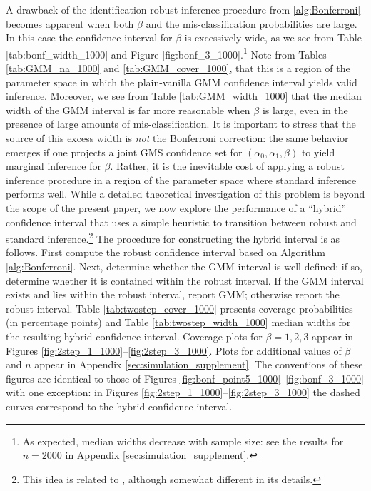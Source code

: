 A drawback of the identification-robust inference procedure from \ref{alg:Bonferroni} becomes apparent when both $\beta$ and the mis-classification probabilities are large.
In this case the confidence interval for $\beta$ is excessively wide, as we see from Table \ref{tab:bonf_width_1000} and Figure \ref{fig:bonf_3_1000}.\footnote{As expected, median widths decrease with sample size: see the results for $n = 2000$ in Appendix \ref{sec:simulation_supplement}.}
Note from Tables \ref{tab:GMM_na_1000} and \ref{tab:GMM_cover_1000}, that this is a region of the parameter space in which the plain-vanilla GMM confidence interval yields valid inference.
Moreover, we see from Table \ref{tab:GMM_width_1000} that the median width of the GMM interval is far more reasonable when $\beta$ is large, even in the presence of large amounts of mis-classification.
It is important to stress that the source of this excess width is \emph{not} the Bonferroni correction: the same behavior emerges if one projects a joint GMS confidence set for $(\alpha_0, \alpha_1, \beta)$ to yield marginal inference for $\beta$.
Rather, it is the inevitable cost of applying a robust inference procedure in a region of the parameter space where standard inference performs well.
While a detailed theoretical investigation of this problem is beyond the scope of the present paper, we now explore the performance of a ``hybrid'' confidence interval that uses a simple heuristic to transition between robust and standard inference.\footnote{This idea is related to \cite{andrews2016valid}, although somewhat different in its details.}
The procedure for constructing the hybrid interval is as follows.
First compute the robust confidence interval based on Algorithm \ref{alg:Bonferroni}.
Next, determine whether the GMM interval is well-defined: if so, determine whether it is contained within the robust interval.
If the GMM interval exists and lies within the robust interval, report GMM; otherwise report the robust interval.
Table \ref{tab:twostep_cover_1000} presents coverage probabilities (in percentage points) and Table \ref{tab:twostep_width_1000} median widths for the resulting hybrid confidence interval.
Coverage plots for $\beta = 1, 2, 3$ appear in Figures \ref{fig:2step_1_1000}--\ref{fig:2step_3_1000}.
Plots for additional values of $\beta$ and $n$ appear in Appendix \ref{sec:simulation_supplement}.
The conventions of these figures are identical to those of Figures \ref{fig:bonf_point5_1000}--\ref{fig:bonf_3_1000} with one exception: in Figures \ref{fig:2step_1_1000}--\ref{fig:2step_3_1000} the dashed curves correspond to the hybrid confidence interval.

